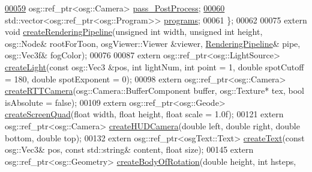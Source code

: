 \begin{DoxyCode}
\hypertarget{_util_functions_8h_source_l00059}{}\hyperlink{structbrtr_1_1_rendering_pipeline_aea2228e41f1e5c6db5d616c05ecc27fd}{00059}         osg::ref\_ptr<osg::Camera> \hyperlink{structbrtr_1_1_rendering_pipeline_aea2228e41f1e5c6db5d616c05ecc27fd}{pass\_PostProcess};         
\hypertarget{_util_functions_8h_source_l00060}{}\hyperlink{structbrtr_1_1_rendering_pipeline_afe773fb98986d39ef23a4edf3634af10}{00060}         std::vector<osg::ref\_ptr<osg::Program>> \hyperlink{structbrtr_1_1_rendering_pipeline_afe773fb98986d39ef23a4edf3634af10}{programs};   
00061     \};
00062 
00075     \textcolor{keyword}{extern} \textcolor{keywordtype}{void} \hyperlink{namespacebrtr_adcf0546a392221be3958ec96f99887f0}{createRenderingPipeline}(\textcolor{keywordtype}{unsigned} \textcolor{keywordtype}{int} width, \textcolor{keywordtype}{unsigned} \textcolor{keywordtype}{int} height, 
      osg::Node& rootForToon, osgViewer::Viewer &viewer, \hyperlink{structbrtr_1_1_rendering_pipeline}{RenderingPipeline}& pipe, osg::Vec3f& 
      fogColor);
00076     
00087     \textcolor{keyword}{extern} osg::ref\_ptr<osg::LightSource> \hyperlink{namespacebrtr_ad772c6dbc0a2cabd40a284676c124a97}{createLight}(\textcolor{keyword}{const} osg::Vec3 &pos, \textcolor{keywordtype}{int} lightNum, \textcolor{keywordtype}{int} 
      point = 1, \textcolor{keywordtype}{double} spotCutoff = 180, \textcolor{keywordtype}{double} spotExponent = 0);
00098     \textcolor{keyword}{extern} osg::ref\_ptr<osg::Camera> \hyperlink{namespacebrtr_aa7a89c381be095a7eb1e248d2e6c0e23}{createRTTCamera}(osg::Camera::BufferComponent buffer, 
      osg::Texture* tex, \textcolor{keywordtype}{bool} isAbsolute = \textcolor{keyword}{false});
00109     \textcolor{keyword}{extern} osg::ref\_ptr<osg::Geode> \hyperlink{namespacebrtr_a32cfc96621681baabc76c52af5d6a347}{createScreenQuad}(\textcolor{keywordtype}{float} width, \textcolor{keywordtype}{float} height, \textcolor{keywordtype}{float} scale
       = 1.0f);
00121     \textcolor{keyword}{extern} osg::ref\_ptr<osg::Camera> \hyperlink{namespacebrtr_a62da4f109238c45882dd64d7a7e97a1d}{createHUDCamera}(\textcolor{keywordtype}{double} left, \textcolor{keywordtype}{double} right, \textcolor{keywordtype}{double} 
      bottom, \textcolor{keywordtype}{double} top);
00132     \textcolor{keyword}{extern} osg::ref\_ptr<osgText::Text> \hyperlink{namespacebrtr_a4431de1c1fa2c1d42c4fb57c38aaa3ce}{createText}(\textcolor{keyword}{const} osg::Vec3& pos, \textcolor{keyword}{const} std::string& 
      content, \textcolor{keywordtype}{float} size);
00145     \textcolor{keyword}{extern} osg::ref\_ptr<osg::Geometry> \hyperlink{namespacebrtr_a83d3e627c9dc247459610aa9fec23d7b}{createBodyOfRotation}(\textcolor{keywordtype}{double} height, \textcolor{keywordtype}{int} hsteps, \textcolor{keywordtype}{
}
\end{DoxyCode}
